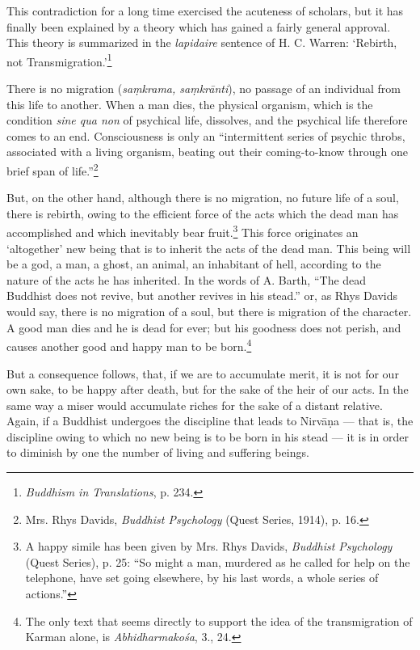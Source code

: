 \documentclass[a4paper, 11pt, oneside, english]{article}
\begin{document}
This contradiction for a long time exercised the acuteness of scholars, but it has finally been explained by a theory which has gained a fairly general approval. This theory is summarized in the \emph{lapidaire} sentence of H. C. Warren: `Rebirth, not Transmigration.'\footnote{\emph{Buddhism in Translations}, p. 234.}

There is no migration (\emph{saṃkrama, saṃkrānti}), no passage of an individual from this life to another. When a man dies, the physical organism, which is the condition \emph{sine qua non} of psychical life, dissolves, and the psychical life therefore comes to an end. Consciousness is only an ``intermittent series of psychic throbs, associated with a living organism, beating out their coming-to-know through one brief span of life.''\footnote{Mrs. Rhys Davids, \emph{Buddhist Psychology} (Quest Series, 1914), p. 16.}

But, on the other hand, although there is no migration, no future life of a soul, there is rebirth, owing to the efficient force of the acts which the dead man has accomplished and which inevitably bear fruit.\footnote{A happy simile has been given by Mrs. Rhys Davids, \emph{Buddhist Psychology} (Quest Series), p. 25: ``So might a man, murdered as he called for help on the telephone, have set going elsewhere, by his last words, a whole series of actions.''} This force originates an `altogether' new being that is to inherit the acts of the dead man. This being will be a god, a man, a ghost, an animal, an inhabitant of hell, according to the nature of the acts he has inherited. In the words of A. Barth, ``The dead Buddhist does not revive, but another revives in his stead.'' or, as Rhys Davids would say, there is no migration of a soul, but there is migration of the character. A good man dies and he is dead for ever; but his goodness does not perish, and causes another good and happy man to be born.\footnote{The only text that seems directly to support the idea of the transmigration of Karman alone, is \emph{Abhidharmakośa}, 3., 24.}

But a consequence follows, that, if we are to accumulate merit, it is not for our own sake, to be happy after death, but for the sake of the heir of our acts. In the same way a miser would accumulate riches for the sake of a distant relative. Again, if a Buddhist undergoes the discipline that leads to Nirvāṇa --- that is, the discipline owing to which no new being is to be born in his stead --- it is in order to diminish by one the number of living and suffering beings.
\end{document}

